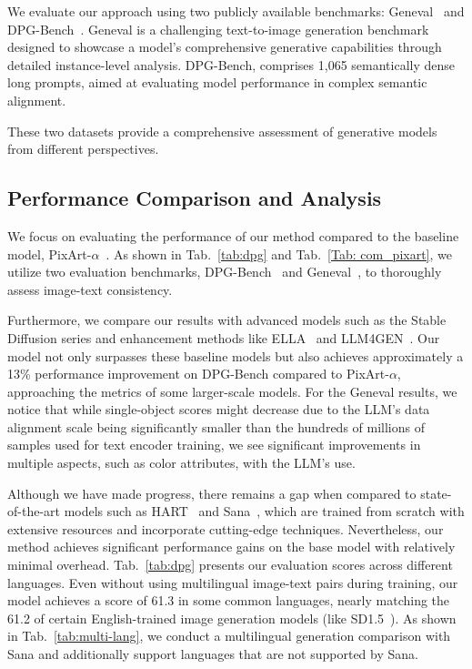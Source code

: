 We evaluate our approach using two publicly available benchmarks: Geneval~\cite{ghosh2023geneval} and DPG-Bench~\cite{hu2024ella}. Geneval is a challenging text-to-image generation benchmark designed to showcase a model's comprehensive generative capabilities through detailed instance-level analysis. DPG-Bench, comprises 1,065 semantically dense long prompts, aimed at evaluating model performance in complex semantic alignment. 

These two datasets provide a comprehensive assessment of generative models from different perspectives.


\subsection{Performance Comparison and Analysis}





We focus on evaluating the performance of our method compared to the baseline model, PixArt-$\alpha$~\cite{chen2023pixart}. As shown in Tab.~\ref{tab:dpg} and Tab.~\ref{Tab: com_pixart}, we utilize two evaluation benchmarks, DPG-Bench~\cite{hu2024ella} and Geneval~\cite{ghosh2023geneval}, to thoroughly assess image-text consistency.

Furthermore, we compare our results with advanced models such as the Stable Diffusion series and enhancement methods like ELLA~\cite{hu2024ella} and LLM4GEN~\cite{liu2024llm4genleveragingsemanticrepresentation}. Our model not only surpasses these baseline models but also achieves approximately a 13\% performance improvement on DPG-Bench compared to PixArt-$\alpha$, approaching the metrics of some larger-scale models. For the Geneval results, we notice that while single-object scores might decrease due to the LLM's data alignment scale being significantly smaller than the hundreds of millions of samples used for text encoder training, we see significant improvements in multiple aspects, such as color attributes, with the LLM's use.

Although we have made progress, there remains a gap when compared to state-of-the-art models such as HART~\cite{tang2024hart} and Sana~\cite{xie2024sana}, which are trained from scratch with extensive resources and incorporate cutting-edge techniques. Nevertheless, our method achieves significant performance gains on the base model with relatively minimal overhead. Tab.~\ref{tab:dpg} presents our evaluation scores across different languages. Even without using multilingual image-text pairs during training, our model achieves a score of 61.3 in some common languages, nearly matching the 61.2 of certain English-trained image generation models (like SD1.5~\cite{rombach2022high}). As shown in Tab.~\ref{tab:multi-lang}, we conduct a multilingual generation comparison with Sana and additionally support languages that are not supported by Sana.

